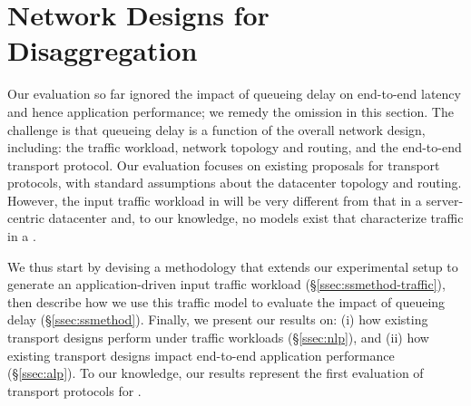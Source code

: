 \vspace{-0.1in}
\section{Network Designs for Disaggregation}
\label{sec:existing}
\vspace{-0.05in}
Our evaluation so far ignored the impact of queueing delay on end-to-end latency and hence application performance; we remedy the omission in this section.
The challenge is that queueing delay is a function of the overall network design, including: the traffic workload, network topology and routing, and the end-to-end transport protocol. Our evaluation focuses on existing proposals for transport protocols, with standard assumptions about the datacenter topology and routing. However, the input traffic workload in \dis will be very different from that in a server-centric datacenter and, to our knowledge, no models exist that characterize traffic in a \dis. 

We thus start by devising a methodology that extends our experimental setup to generate an application-driven input traffic workload (\S\ref{ssec:ssmethod-traffic}), then describe how we use this traffic model to evaluate the impact of queueing delay (\S\ref{ssec:ssmethod}). Finally, we present our results on: (i) how existing transport designs perform under \dis traffic workloads (\S\ref{ssec:nlp}), and (ii) how existing transport designs impact end-to-end application performance (\S\ref{ssec:alp}). To our knowledge, our results represent the first evaluation of transport protocols for \dis. 

